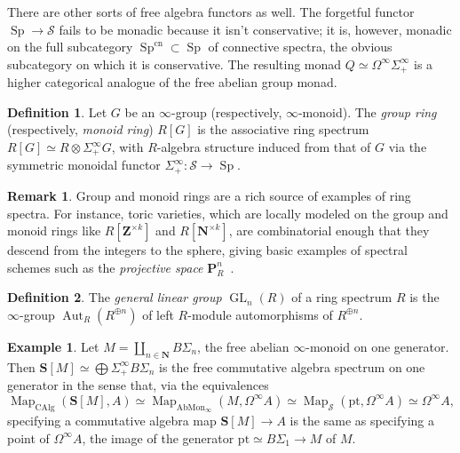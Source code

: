 \documentclass[12pt]{article}
\theoremstyle{definition}
\newtheorem{definition}{Definition}[subsection]
\newtheorem{example}{Example}[subsection]
\newtheorem{remark}{Remark}[subsection]
\renewcommand{\S}{\mathcal{S}}
\newcommand{\NN}{\mathbf{N}}
\newcommand{\PP}{\mathbf{P}}
\renewcommand{\SS}{\mathbf{S}}
\newcommand{\ZZ}{\mathbf{Z}}
\renewcommand{\i}{\infty}
\DeclareMathOperator{\CAlg}{CAlg}
\DeclareMathOperator{\Aut}{Aut}
\DeclareMathOperator{\Map}{Map}
\DeclareMathOperator{\Sp}{Sp}
\DeclareMathOperator{\GL}{GL}
\newcommand{\cn}{\mathrm{cn}}
\newcommand{\pt}{\mathrm{pt}}
\begin{document}
There are other sorts of free algebra functors as well.
The forgetful functor $\Sp\to\S$ fails to be monadic because it isn't conservative; it is, however, monadic on the full subcategory $\Sp^{\cn}\subset\Sp$ of connective spectra, the obvious subcategory on which it is conservative.
The resulting monad $Q\simeq\Omega^\infty\Sigma^\infty_+$ is a higher categorical analogue of the free abelian group monad.




\begin{definition}
Let $G$ be an $\infty$-group (respectively, $\infty$-monoid).
The {\em group ring} (respectively, {\em monoid ring}) $R[G]$ is the associative ring spectrum $R[G]\simeq R\otimes\Sigma^\infty_+ G$, with $R$-algebra structure induced from that of $G$ via the symmetric monoidal functor $\Sigma^\infty_+:\S\to\Sp$.
\end{definition}

\begin{remark}
Group and monoid rings are a rich source of examples of ring spectra.
For instance, toric varieties, which are locally modeled on the group and monoid rings like $R[\ZZ^{\times k}]$ and $R[\NN^{\times k}]$, are combinatorial enough that they descend from the integers to the sphere, giving basic examples of spectral schemes such as the {\em projective space} $\PP^n_R$~\cite[Construction 5.4.1.3]{SAG}.
\end{remark}

\begin{definition}
The {\em general linear group} $\GL_n(R)$ of a ring spectrum $R$ is the $\i$-group $\Aut_R(R^{\oplus n})$ of left $R$-module automorphisms of $R^{\oplus n}$.
\end{definition}




\begin{example}
Let $M=\coprod_{n\in\NN} B\Sigma_n$, the free abelian $\i$-monoid on one generator.
Then $\SS[M]\simeq\bigoplus\Sigma^\infty_+ B\Sigma_n$ is the free commutative algebra spectrum on one generator in the sense that, via the equivalences
\[
\Map_{\CAlg}(\SS[M],A)\simeq\Map_{\mathrm{AbMon}_\infty}(M,\Omega^\infty A)\simeq\Map_\S(\pt,\Omega^\infty A)\simeq\Omega^\infty A,
\]
specifying a commutative algebra map $\SS[M]\to A$ is the same as specifying a point of $\Omega^\infty A$, the image of the generator $\pt\simeq B\Sigma_1\to M$ of $M$.
\end{example}
\end{document}
